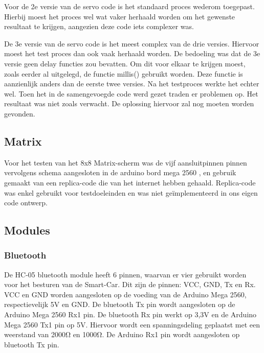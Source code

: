 Voor de 2e versie van de servo code is het standaard proces wederom toegepast. Hierbij moest het proces wel wat vaker herhaald worden om het gewenste resultaat te krijgen, aangezien deze code iets complexer was. 

De 3e versie van de servo code is het meest complex van de drie versies. Hiervoor moest het test proces dan ook vaak herhaald worden. De bedoeling was dat de 3e versie geen delay functies zou bevatten. Om dit voor elkaar te krijgen moest, zoals eerder al uitgelegd, de functie millis() gebruikt worden. Deze functie is aanzienlijk anders dan de eerste twee versies. Na het testproces werkte het echter wel. Toen het in de samengevoegde code werd gezet traden er problemen op. Het resultaat was niet zoals verwacht. De oplossing hiervoor zal nog moeten worden gevonden. 

\subsection{Matrix}
	Voor het testen van het 8x8 Matrix-scherm was de vijf aansluitpinnen pinnen vervolgens schema aangesloten in de arduino bord mega 2560 , en gebruik gemaakt van een replica-code die van het internet hebben gehaald. Replica-code was enkel gebruikt voor testdoeleinden en was niet geïmplementeerd in ons eigen code ontwerp.
\subsection{Modules}
\subsubsection{Bluetooth}
De HC-05 bluetooth module heeft 6 pinnen, waarvan er vier gebruikt worden voor het besturen van de \gls{Smart-Car}. Dit zijn de pinnen: VCC, GND, \gls{Tx en Rx}. VCC en GND worden aangesloten op de voeding van de Arduino Mega 2560, respectievelijk 5V en GND.  De bluetooth Tx pin wordt aangesloten op de Arduino Mega 2560 Rx1 pin. De bluetooth Rx pin werkt op 3,3V en de Arduino Mega 2560 Tx1 pin op 5V. Hiervoor wordt een spanningsdeling geplaatst met een weerstand van 2000\si{\ohm} en 1000\si{\ohm}. De Arduino Rx1 pin wordt aangesloten op bluetooth Tx pin.

